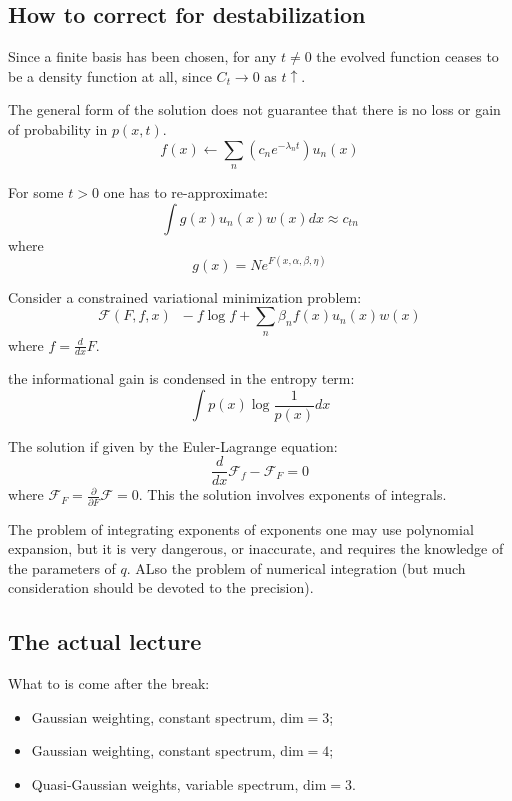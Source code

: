 \documentclass[a4paper]{article}
\newcommand{\brac}[1]{{\left ( #1 \right )}}
\newcommand{\Fcal}{\mathcal{F}}
\newcommand{\defn}{\mathop{\overset{\Delta}{=}}\nolimits}
\begin{document}

\subsection{How to correct for destabilization} %
\label{sub:how_to_correct_for_destabilization}

Since a finite basis has been chosen, for any $t\neq0$ the evolved function ceases to be a density function at all, since $C_t\to 0$ as $t\uparrow$.

The general form of the solution does not guarantee that there is no loss or gain of probability in $p(x,t)$.
\[f(x) \leftarrow \sum_n \brac{c_n e^{-\lambda_n t}} u_n(x)\]

For some $t>0$ one has to re-approximate:
\[\int g(x) u_n(x) w(x) dx \approx c_{tn}\]
where 
\[g(x) = N e^{F(x,\alpha,\beta,\eta)}\]


Consider a constrained variational minimization problem:
\[\Fcal(F, f, x) \defn - f \log f + \sum_n \beta_n f(x) u_n(x) w(x) \]
where $f = \frac{d}{dx} F$.

the informational gain is condensed in the entropy term:
\[\int p(x) \log\frac{1}{p(x)} dx\]

The solution if given by the Euler-Lagrange equation:
\[\frac{d}{dx}\Fcal_f - \Fcal_F = 0\]
where $\Fcal_F = \frac{\partial}{\partial F}\Fcal = 0$.
This the solution involves exponents of integrals.

The problem of integrating exponents of exponents one may use polynomial expansion, but it is very dangerous, or inaccurate, and requires the knowledge of the parameters of $q$.
ALso the problem of numerical integration (but much consideration should be devoted to the precision).



\subsection{The actual lecture} %
\label{sub:the_actual_lecture}

What to is come after the break:
\begin{itemize}
	\item Gaussian weighting, constant spectrum, $\text{dim}=3$;
	\item Gaussian weighting, constant spectrum, $\text{dim}=4$;
	\item Quasi-Gaussian weights, variable spectrum, $\text{dim}=3$.
\end{itemize}
\end{document}
